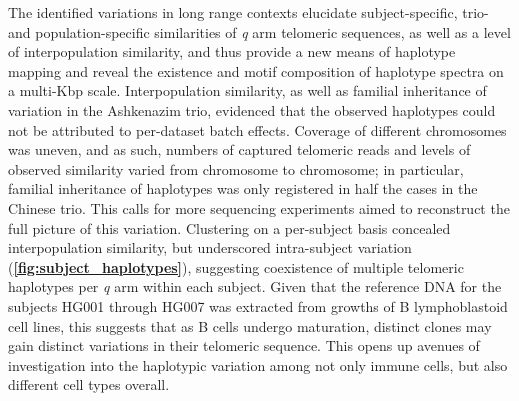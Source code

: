 \documentclass{article}
\begin{document}
    The identified variations in long range contexts elucidate
        subject-specific, trio- and population-specific similarities of \textit{q} arm telomeric sequences,
            as well as a level of interpopulation similarity,
        and thus provide a new means of haplotype mapping and reveal the existence and motif composition of haplotype spectra
            on a multi-Kbp scale.
    Interpopulation similarity, as well as familial inheritance of variation in the Ashkenazim trio,
        evidenced that the observed haplotypes could not be attributed to per-dataset batch effects.
    Coverage of different chromosomes was uneven,
        and as such, numbers of captured telomeric reads and levels of observed similarity varied from chromosome to chromosome;
        in particular, familial inheritance of haplotypes was only registered in half the cases in the Chinese trio.
        This calls for more sequencing experiments aimed to reconstruct the full picture of this variation.
    Clustering on a per-subject basis concealed interpopulation similarity,
        but underscored intra-subject variation (\textbf{\autoref{fig:subject_haplotypes}}),
            suggesting coexistence of multiple telomeric haplotypes per \textit{q} arm within each subject.
        Given that the reference DNA for the subjects HG001 through HG007
            was extracted from growths of B lymphoblastoid cell lines,
            this suggests that as B cells undergo maturation,
                distinct clones may gain distinct variations in their telomeric sequence.
        This opens up avenues of investigation into the haplotypic variation among not only immune cells,
            but also different cell types overall.
\end{document}
